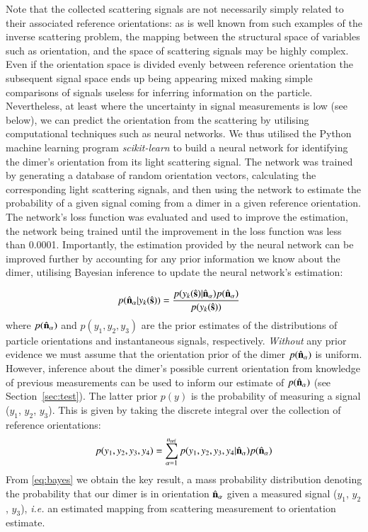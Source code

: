 \documentclass[final,  3p]{elsarticle}
\begin{document}
Note that the collected scattering signals are not necessarily simply related to their associated reference orientations: as is well known from such examples of the inverse scattering problem, the mapping between the structural space of variables such as orientation, and the space of scattering signals may be highly complex. Even if the orientation space is divided evenly between reference orientation the subsequent signal space ends up being appearing mixed making simple comparisons of signals useless for inferring information on the particle. 
Nevertheless, at least where the uncertainty in signal measurements is low (see below), we can predict the orientation from the scattering by utilising computational techniques such as neural networks. We thus utilised the Python machine learning program \textit{scikit-learn} to build a neural network for identifying the dimer's orientation from its light scattering signal. The network was trained by generating a database of random orientation vectors, calculating the corresponding light scattering signals, and then using the network to estimate the probability of a given signal coming from a dimer in a given reference orientation. The network's loss function was evaluated and used to improve the estimation, the network being trained until the improvement in the loss function was less than 0.0001. 
%
Importantly, the estimation provided by the neural network can be improved further by accounting for any prior information we know about the dimer,  utilising Bayesian inference to update the neural network's estimation: 

\begin{align}
  \label{eq:bayes}
  p(\hat{\bf n}_\alpha| y_k(\hat{\bf s}))
  &=
    \frac{p(y_k(\hat{\bf s})|\hat{\bf n}_\alpha)
    p(\hat{\bf n}_\alpha)}{p(y_k(\hat{\bf s}))}
\end{align}
where $p(\hat{\bf n}_\alpha)$ and $p(y_1, y_2, y_3)$ are the prior estimates of the distributions of particle orientations and instantaneous signals, respectively.
\textit{Without} any prior evidence we must assume that the orientation prior of the dimer
$p(\hat{\bf n}_{\alpha})$ is uniform. However, inference about the dimer's possible current orientation from knowledge of previous
measurements can be used to inform our estimate of $p(\hat{\bf n}_{\alpha})$ (see Section~\ref{sec:test}).  The latter prior $p(y)$ is the probability of measuring a signal ($y_1$, $y_2$, $y_3$).  This is given by taking the discrete integral over the collection of reference orientations:
\begin{align}
  p(y_1, y_2, y_3, y_4)
  =
  \sum_{\alpha=1}^{n_{\rm ref}}
  p(y_1, y_2, y_3, y_4|\hat{\bf n}_\alpha)
  p(\hat{\bf n}_\alpha)
\end{align}
From \eqref{eq:bayes} we obtain the key result, a mass probability distribution denoting the
probability that our dimer is in orientation $\hat{\bf n}_{\alpha}$ given a measured
signal ($y_1$, $y_2$, $y_3$), \textit{i.e.} an estimated mapping from scattering measurement to orientation estimate. 
\end{document}
